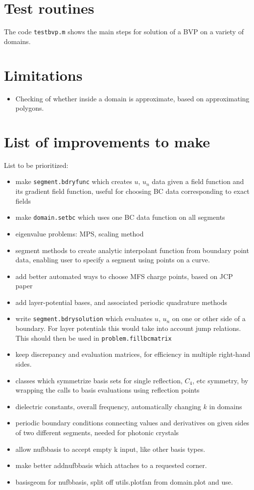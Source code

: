\documentclass[12pt]{article}
\newcommand{\bi}{\begin{itemize}}
\newcommand{\ei}{\end{itemize}}
\begin{document}
\section{Test routines}

The code {\tt testbvp.m} shows the main steps for solution of a BVP on
a variety of domains.

\section{Limitations}

\bi
\item Checking of whether inside a domain is approximate, based on approximating
polygons.
\ei

\section{List of improvements to make}

List to be prioritized:

\bi
\item make {\tt segment.bdryfunc} which creates $u$, $u_n$ data given a
field function and its gradient field function, useful for choosing BC
data corresponding to exact fields
\item make {\tt domain.setbc} which uses one BC data function on all segments
\item eigenvalue problems: MPS, scaling method
\item segment methods to create analytic interpolant function from boundary
point data, enabling user to specify a segment using points on a curve.
\item add better automated ways to choose MFS charge points, based on JCP paper
\item add layer-potential bases, and associated periodic quadrature methods
\item write {\tt segment.bdrysolution} which evaluates $u$, $u_n$ on one
or other side of a boundary. For layer potentials this would take into account
jump relations. This should then be used in {\tt problem.fillbcmatrix}
\item keep discrepancy and evaluation matrices, for efficiency in multiple
right-hand sides.
\item classes which symmetrize basis sets for single reflection, $C_4$, etc
symmetry, by wrapping the calls to basis evaluations using reflection
points
\item dielectric constants, overall frequency,
automatically changing $k$ in domains
\item periodic boundary conditions connecting values and derivatives
on given sides of two different segments, needed for photonic crystals
\item allow nufbbasis to accept empty k input, like other basis types.
\item make better addnufbbasis which attaches to a requested corner.
\item basisgeom for nufbbasis, split off utils.plotfan from domain.plot and
use.
\ei
\end{document}
